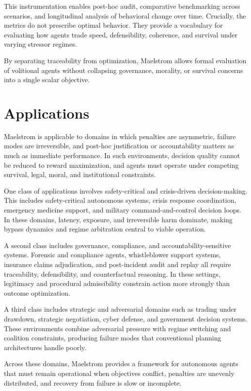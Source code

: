 \documentclass[11pt,a4paper]{article}
\begin{document}
This instrumentation enables post-hoc audit, comparative benchmarking across scenarios, and longitudinal analysis of behavioral change over time. Crucially, the metrics do not prescribe optimal behavior. They provide a vocabulary for evaluating how agents trade speed, defensibility, coherence, and survival under varying stressor regimes.

By separating traceability from optimization, Maelstrom allows formal evaluation of volitional agents without collapsing governance, morality, or survival concerns into a single scalar objective.

\section{Applications}

Maelstrom is applicable to domains in which penalties are asymmetric, failure modes are irreversible, and post-hoc justification or accountability matters as much as immediate performance. In such environments, decision quality cannot be reduced to reward maximization, and agents must operate under competing survival, legal, moral, and institutional constraints.

One class of applications involves safety-critical and crisis-driven decision-making. This includes safety-critical autonomous systems, crisis response coordination, emergency medicine support, and military command-and-control decision loops. In these domains, latency, exposure, and irreversible harm dominate, making bypass dynamics and regime arbitration central to viable operation.

A second class includes governance, compliance, and accountability-sensitive systems. Forensic and compliance agents, whistleblower support systems, insurance claims adjudication, and post-incident audit and replay all require traceability, defensibility, and counterfactual reasoning. In these settings, legitimacy and procedural admissibility constrain action more strongly than outcome optimization.

A third class includes strategic and adversarial domains such as trading under drawdown, strategic negotiation, cyber defense, and government decision systems. These environments combine adversarial pressure with regime switching and coalition constraints, producing failure modes that conventional planning architectures handle poorly.

Across these domains, Maelstrom provides a framework for autonomous agents that must remain operational when objectives conflict, penalties are unevenly distributed, and recovery from failure is slow or incomplete.
\end{document}
